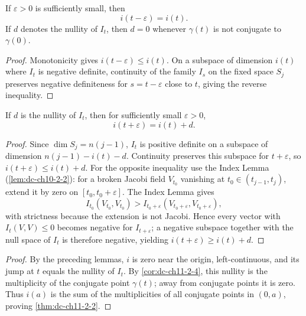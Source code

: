 \begin{lemma}
  \label{lem:dc-ch11-2-7}
  If $\varepsilon>0$ is sufficiently small, then
  \[
    i(t-\varepsilon)=i(t).
  \]
  If $d$ denotes the nullity of $I_t$, then $d=0$ whenever $\gamma(t)$ is not
  conjugate to $\gamma(0)$.
\end{lemma}
\begin{proof}
  \sketch
  Monotonicity gives $i(t-\varepsilon)\leq i(t)$. On a subspace of dimension
  $i(t)$ where $I_t$ is negative definite, continuity of the family $I_s$ on the
  fixed space $S_j$ preserves negative definiteness for $s=t-\varepsilon$ close
  to $t$, giving the reverse inequality.
\end{proof}

\begin{lemma}
  \label{lem:dc-ch11-2-8}
  If $d$ is the nullity of $I_t$, then for sufficiently small $\varepsilon>0$,
  \[
    i(t+\varepsilon)=i(t)+d.
  \]
\end{lemma}
\begin{proof}
  \sketch
  Since $\dim S_j=n(j-1)$, $I_t$ is positive definite on a subspace of dimension
  $n(j-1)-i(t)-d$. Continuity preserves this subspace for $t+\varepsilon$, so
  $i(t+\varepsilon)\leq i(t)+d$. For the opposite inequality use the Index Lemma
  (\cref{lem:dc-ch10-2-2}): for a broken Jacobi field $V_{t_0}$ vanishing at
  $t_0\in(t_{j-1},t_j)$, extend it by zero on $[t_0,t_0+\varepsilon]$. The Index
  Lemma gives
  \[
    I_{t_0}(V_{t_0},V_{t_0})>
    I_{t_0+\varepsilon}(V_{t_0+\varepsilon},V_{t_0+\varepsilon}),
  \]
  with strictness because the extension is not Jacobi. Hence every vector with
  $I_t(V,V)\leq0$ becomes negative for $I_{t+\varepsilon}$; a negative subspace
  together with the null space of $I_t$ is therefore negative, yielding
  $i(t+\varepsilon)\geq i(t)+d$.
\end{proof}

\begin{proof}
  \sketch
  By the preceding lemmas, $i$ is zero near the origin, left-continuous, and its
  jump at $t$ equals the nullity of $I_t$. By \cref{cor:dc-ch11-2-4}, this nullity
  is the multiplicity of the conjugate point $\gamma(t)$; away from conjugate
  points it is zero. Thus $i(a)$ is the sum of the multiplicities of all conjugate
  points in $(0,a)$, proving \cref{thm:dc-ch11-2-2}.
\end{proof}

